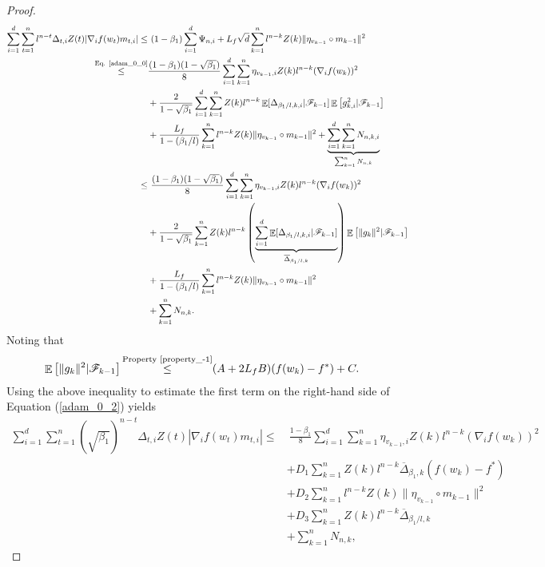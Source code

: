 \documentclass{article} %
\DeclareMathOperator{\Expect}{\mathbb{E}}
\begin{document}
\begin{proof}
\begin{align}
\sum_{i=1}^{d}\sum_{t=1}^{n}l^{n-t}\Delta_{t,i}Z(t)|\nabla_{i} f(w_{t})m_{t,i}|\le&\ (1-\beta_{1})\sum_{i=1}^{d}\Psi_{n,i}\notag+L_{f}\sqrt{d}\sum_{k=1}^{n}l^{n-k}Z(k)\|\eta_{v_{k-1}}\circ m_{k-1}\|^{2}\notag\\\mathop{\le}^{\text{Eq. \ref{adam_0_0}}}& \frac{(1-\beta_{1})(1-\sqrt{\beta_{1}})}{8}\sum_{i=1}^{d}\sum_{k=1}^{n}\eta_{v_{k-1},i}Z(k)l^{n-k}(\nabla_{i}f(w_{k}))^{2}\notag\\&+\frac{2}{1-\sqrt{\beta_{1}}}\sum_{i=1}^{d}\sum_{k=1}^{n}Z(k)l^{n-k}\Expect[\Delta_{\beta_{1}/l,k,i}|\mathscr{F}_{k-1}]\Expect\left[g^{2}_{k,i}|\mathscr{F}_{k-1}\right]\notag\\&+\frac{L_{f}}{1-(\beta_{1}/l)}\sum_{k=1}^{n}l^{n-k}Z(k)\|\eta_{v_{k-1}}\circ m_{k-1}\|^{2}+\underbrace{\sum_{i=1}^{d}\sum_{k=1}^{n}N_{n,k,i}}_{\sum_{k=1}^{n}N_{n,k}}\notag\\\le &\ \frac{(1-\beta_{1})(1-\sqrt{\beta_{1}})}{8}\sum_{i=1}^{d}\sum_{k=1}^{n}\eta_{v_{k-1},i}Z(k)l^{n-k}(\nabla_{i}f(w_{k}))^{2}\notag\\&+\frac{2}{1-\sqrt{\beta_{1}}}\sum_{k=1}^{n}Z(k)l^{n-k}\left(\underbrace{\sum_{i=1}^{d}\Expect[\Delta_{\beta_{1}/l,k,i}|\mathscr{F}_{k-1}]}_{\overline{\Delta}_{\beta_{1}/l,k}}\right)\Expect\left[\|g_{k}\|^2|\mathscr{F}_{k-1}\right]\notag\\&+\frac{L_{f}}{1-(\beta_{1}/l)}\sum_{k=1}^{n}l^{n-k}Z(k)\|\eta_{v_{k-1}}\circ m_{k-1}\|^{2}\notag\\&+\sum_{k=1}^{n}N_{n,k} .
\end{align}
Noting that
\begin{align*}
\Expect\left[\|g_{k}\|^{2}|\mathscr{F}_{k-1}\right]&\mathop{\le}^{\text{Property \ref{property_-1}}}(A+2L_{f}B)(f(w_{k})-f^*)+C.%
\end{align*}
Using the above inequality to estimate the first term on the right-hand side of Equation (\ref{adam_0_2}) yields
\begin{align*}
 \sum_{i=1}^{d}\sum_{t=1}^{n}(\sqrt{\beta_{1}})^{n-t}\Delta_{t,i}Z(t)|\nabla_{i} f(w_{t})m_{t,i}|\le&\ \frac{1-\beta_{1}}{8}\sum_{i=1}^{d}\sum_{k=1}^{n}\eta_{v_{k-1},i}Z(k)l^{n-k}(\nabla_{i}f(w_{k}))^{2}\\&+D_{1}\sum_{k=1}^{n}Z(k)l^{n-k}\overline{\Delta}_{\beta_{1},k}(f(w_{k})-f^*)\\&+D_{2}\sum_{k=1}^{n}l^{n-k}Z(k)\|\eta_{v_{k-1}}\circ m_{k-1}\|^{2}\\&+D_{3}\sum_{k=1}^{n}Z(k)l^{n-k}\overline{\Delta}_{\beta_{1}/l,k}\\&+\sum_{k=1}^{n}N_{n,k},

\end{align*}
\end{proof}
\end{document}
